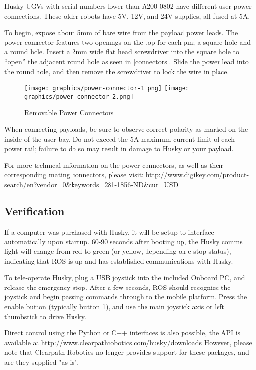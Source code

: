 \documentclass[]{clearpath-latex/clearpath-manual}
\begin{document}
Husky UGVs with serial numbers lower than A200-0802 have different user power connections.  These older robots have
5V, 12V, and 24V supplies, all fused at 5A.

To begin, expose about 5mm of bare wire from the payload power leads. The power connector features two
openings on the top for each pin; a square hole and a round hole. Insert a 2mm wide flat head screwdriver
into the square hole to “open” the adjacent round hole as seen in \autoref{connectors}. Slide the power lead into the round hole, and then
remove the screwdriver to lock the wire in place.

\begin{figure}[h]
	\centering
	\texttt{[image: graphics/power-connector-1.png]}
	\texttt{[image: graphics/power-connector-2.png]}
	\caption{Removable Power Connectors}
	\label{connectors}
\end{figure}

When connecting payloads, be sure to observe correct polarity as marked on the inside of the user bay.
Do not exceed the 5A maximum current limit of each power rail; failure to do so may result in damage
to Husky or your payload.

For more technical information on the power connectors, as well as their corresponding mating connectors, please visit: \url{http://www.digikey.com/product-search/en?vendor=0&keywords=281-1856-ND&cur=USD}

\subsection{Verification}
If a computer was purchased with Husky, it will be setup to interface automatically upon startup.
60-90 seconds after booting up, the Husky comms light will change from red to green
(or yellow, depending on e-stop status), indicating that ROS is up and has established communications with Husky.

To tele-operate Husky, plug a USB joystick into the included Onboard PC, and release the emergency stop.
After a few seconds, ROS should recognize the joystick and begin passing commands through to the mobile platform.
Press the enable button (typically button 1), and use the main joystick axis or left thumbstick to drive Husky.

Direct control using the Python or C++ interfaces is also possible, the API is available at
\url{http://www.clearpathrobotics.com/husky/downloads} However, please note that Clearpath Robotics no
longer provides support for these packages, and are they supplied "as is".
\end{document}
